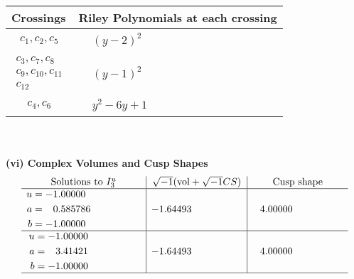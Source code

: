 \documentclass[1p]{elsarticle_modified}
\theoremstyle{definition}
\newcommand{\I}{\sqrt{-1}}
\begin{document}
\begin{tabular}{m{50pt}|m{274pt}}
Crossings & \hspace{64pt}Riley Polynomials at each crossing \\
\hline $$\begin{aligned}c_{1},c_{2},c_{5}\end{aligned}$$&$\begin{aligned}
&(y-2)^2
\end{aligned}$\\
\hline $$\begin{aligned}c_{3},c_{7},c_{8}\\c_{9},c_{10},c_{11}\\c_{12}\end{aligned}$$&$\begin{aligned}
&(y-1)^2
\end{aligned}$\\
\hline $$\begin{aligned}c_{4},c_{6}\end{aligned}$$&$\begin{aligned}
&y^2-6 y+1
\end{aligned}$\\
\hline
\end{tabular}\\~\\
\newpage\flushleft \textbf{(vi) Complex Volumes and Cusp Shapes}
$$\begin{array}{c|c|c}  
\text{Solutions to }I^u_{3}& \I (\text{vol} + \sqrt{-1}CS) & \text{Cusp shape}\\
 \hline 
\begin{aligned}
u &= -1.00000\phantom{ +0.000000I} \\
a &= \phantom{-}0.585786\phantom{ +0.000000I} \\
b &= -1.00000\phantom{ +0.000000I}\end{aligned}
 & -1.64493\phantom{ +0.000000I} & \phantom{-}4.00000\phantom{ +0.000000I} \\ \hline\begin{aligned}
u &= -1.00000\phantom{ +0.000000I} \\
a &= \phantom{-}3.41421\phantom{ +0.000000I} \\
b &= -1.00000\phantom{ +0.000000I}\end{aligned}
 & -1.64493\phantom{ +0.000000I} & \phantom{-}4.00000\phantom{ +0.000000I}\\
 \hline 
 \end{array}$$\newpage
\newpage\renewcommand{\arraystretch}{1}
\end{document}
